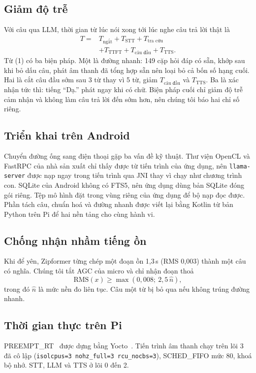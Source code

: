 \documentclass[a4paper,12pt,twocolumn]{article}
\begin{document}
\subsection{Giảm độ trễ}
Với câu qua LLM, thời gian từ lúc nói xong tới lúc nghe câu trả lời thật là
\begin{equation}
\begin{split}
T ={}& T_{\text{ngắt}} + T_{\text{STT}} + T_{\text{tra cứu}}\\
&+ T_{\text{TTFT}} + T_{\text{câu đầu}} + T_{\text{TTS}}.
\end{split}
\end{equation}
Từ (1) có ba biện pháp. Một là đường nhanh: 149 cặp hỏi đáp có sẵn, khớp sau khi bỏ dấu câu, phát âm thanh đã tổng hợp sẵn nên loại bỏ cả bốn số hạng cuối. Hai là cắt câu đầu sớm sau 3 từ thay vì 5 từ, giảm $T_{\text{câu đầu}}$ và $T_{\text{TTS}}$. Ba là xác nhận tức thì: tiếng ``Dạ.'' phát ngay khi có chữ. Biện pháp cuối chỉ giảm độ trễ cảm nhận và không làm câu trả lời đến sớm hơn, nên chúng tôi báo hai chỉ số riêng.

\subsection{Triển khai trên Android}
Chuyển đường ống sang điện thoại gặp ba vấn đề kỹ thuật. Thư viện OpenCL và FastRPC của nhà sản xuất chỉ thấy được từ tiến trình của ứng dụng, nên \texttt{llama-server} được nạp ngay trong tiến trình qua JNI thay vì chạy như chương trình con. SQLite của Android không có FTS5, nên ứng dụng dùng bản SQLite đóng gói riêng. Tệp mô hình đặt trong vùng riêng của ứng dụng để bộ nạp đọc được. Phần tách câu, chuẩn hoá và đường nhanh được viết lại bằng Kotlin từ bản Python trên Pi để hai nền tảng cho cùng hành vi.

\subsection{Chống nhận nhầm tiếng ồn}
Khi để yên, Zipformer từng chép một đoạn ồn 1,3\,s (RMS 0,003) thành một câu có nghĩa. Chúng tôi tắt AGC của micro và chỉ nhận đoạn thoả
\begin{equation}
\text{RMS}(x) \ge \max(0{,}008;\ 2{,}5\,\hat{n}),
\end{equation}
trong đó $\hat{n}$ là mức nền đo liên tục. Câu một từ bị bỏ qua nếu không trúng đường nhanh.

\subsection{Thời gian thực trên Pi}
PREEMPT\_RT~\cite{preemptrt} được dựng bằng Yocto~\cite{yocto}. Tiến trình âm thanh chạy trên lõi 3 đã cô lập (\texttt{isolcpus=3 nohz\_full=3 rcu\_nocbs=3}), SCHED\_FIFO mức 80, khoá bộ nhớ. STT, LLM và TTS ở lõi 0 đến 2.
\end{document}
